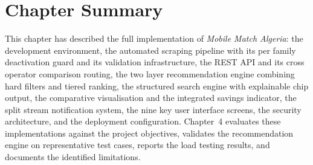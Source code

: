 \section{Chapter Summary}

This chapter has described the full implementation of \textit{Mobile Match Algeria}: the development environment, the automated scraping pipeline with its per family deactivation guard and its validation infrastructure, the REST API and its cross operator comparison routing, the two layer recommendation engine combining hard filters and tiered ranking, the structured search engine with explainable chip output, the comparative visualisation and the integrated savings indicator, the split stream notification system, the nine key user interface screens, the security architecture, and the deployment configuration. Chapter~4 evaluates these implementations against the project objectives, validates the recommendation engine on representative test cases, reports the load testing results, and documents the identified limitations.
